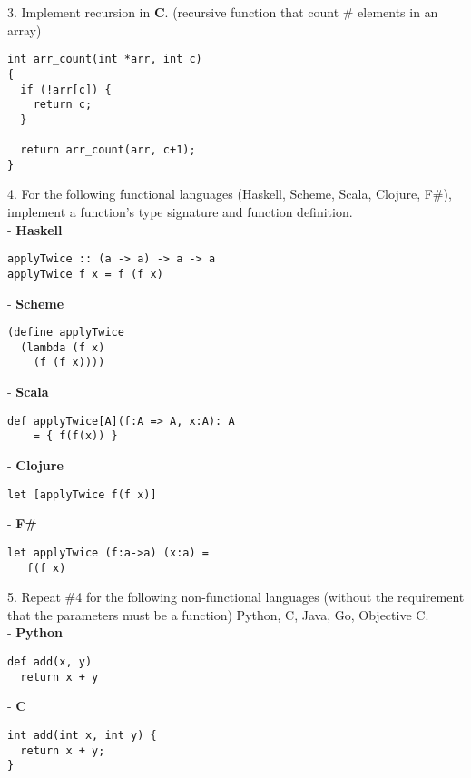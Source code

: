 \documentclass[conference]{IEEEtran}
\begin{document}
3. Implement recursion in \textbf{C}. (recursive function that count \# elements in an array)
\lstset{language=c}
\begin{lstlisting}[frame=single]
int arr_count(int *arr, int c)
{
  if (!arr[c]) {
    return c;
  }

  return arr_count(arr, c+1);
}
\end{lstlisting}

4. For the following functional languages (Haskell, Scheme, Scala, Clojure, F\#), implement a function's type signature and function definition.
\\
- \textbf{Haskell}
\lstset{language=Haskell}
\begin{lstlisting}[frame=single]
applyTwice :: (a -> a) -> a -> a  
applyTwice f x = f (f x)
\end{lstlisting}

- \textbf{Scheme}
\lstset{language=Lisp}
\begin{lstlisting}[frame=single]
(define applyTwice
  (lambda (f x)
    (f (f x))))
\end{lstlisting}

- \textbf{Scala}
\lstset{language=Haskell}
\begin{lstlisting}[frame=single]
def applyTwice[A](f:A => A, x:A): A
    = { f(f(x)) }
\end{lstlisting}

- \textbf{Clojure}
\lstset{language=Lisp}
\begin{lstlisting}[frame=single]
let [applyTwice f(f x)]
\end{lstlisting}

- \textbf{F\#}
\lstset{language=Haskell}
\begin{lstlisting}[frame=single]
let applyTwice (f:a->a) (x:a) =
   f(f x)
\end{lstlisting}

5. Repeat \#4 for the following non-functional languages (without the requirement that the parameters must be a function) Python, C, Java, Go, Objective C.
\\
- \textbf{Python}
\lstset{language=Python}
\begin{lstlisting}[frame=single]
def add(x, y)
  return x + y
\end{lstlisting}

- \textbf{C}
\lstset{language=c}
\begin{lstlisting}[frame=single]
int add(int x, int y) {
  return x + y;
}
\end{lstlisting}
\end{document}
